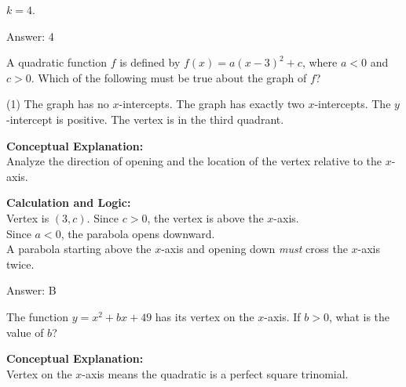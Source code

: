 \documentclass[11pt,paper=a4,answers]{exam}
\begin{document}
\begin{questions}
\begin{solution}
\vspace{10pt}

$k = 4$.

\vspace{25pt}

Answer: \colorbox{yellow!100}{4}
\end{solution}

\vspace{40pt}

\question
A quadratic function $f$ is defined by $f(x) = a(x-3)^2 + c$, where $a < 0$ and $c > 0$. Which of the following must be true about the graph of $f$?
\begin{tasks}(1)
    \task The graph has no $x$-intercepts.
    \task The graph has exactly two $x$-intercepts.
    \task The $y$-intercept is positive.
    \task The vertex is in the third quadrant.
\end{tasks}

\begin{solution}
\textbf{Conceptual Explanation:} \\
Analyze the direction of opening and the location of the vertex relative to the $x$-axis.

\vspace{20pt}

\textbf{Calculation and Logic:} \\
Vertex is $(3, c)$. Since $c > 0$, the vertex is above the $x$-axis. \\
Since $a < 0$, the parabola opens downward. \\
A parabola starting above the $x$-axis and opening down \textit{must} cross the $x$-axis twice.

\vspace{25pt}

Answer: \colorbox{yellow!100}{B}
\end{solution}

\vspace{40pt}

\question
The function $y = x^2 + bx + 49$ has its vertex on the $x$-axis. If $b > 0$, what is the value of $b$?

\begin{solution}
\textbf{Conceptual Explanation:} \\
Vertex on the $x$-axis means the quadratic is a perfect square trinomial.


\end{solution}
\end{questions}
\end{document}

